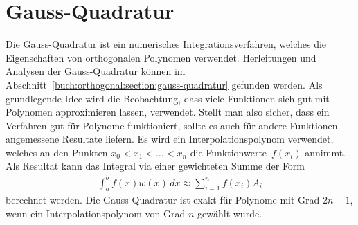 %
%
%
\section{Gauss-Quadratur%
  \label{laguerre:section:quadratur}}
%
Die Gauss-Quadratur ist ein numerisches Integrationsverfahren,
welches die Eigenschaften von orthogonalen Polynomen verwendet.
Herleitungen und Analysen der Gauss-Quadratur können im
Abschnitt~\ref{buch:orthogonal:section:gauss-quadratur} gefunden werden.
Als grundlegende Idee wird die Beobachtung,
dass viele Funktionen sich gut mit Polynomen approximieren lassen,
verwendet.
Stellt man also sicher,
dass ein Verfahren gut für Polynome funktioniert,
sollte es auch für andere Funktionen angemessene Resultate liefern.
Es wird ein Interpolationspolynom verwendet,
welches an den Punkten $x_0 < x_1 < \ldots < x_n$
die Funktionwerte~$f(x_i)$ annimmt.
Als Resultat kann das Integral via einer gewichteten Summe der Form
\begin{align}
\int_a^b f(x) w(x) \, dx
\approx
\sum_{i=1}^n f(x_i) A_i
\label{laguerre:gaussquadratur}
\end{align}
berechnet werden.
Die Gauss-Quadratur ist exakt für Polynome mit Grad $2n -1$,
wenn ein Interpolationspolynom von Grad $n$ gewählt wurde.


